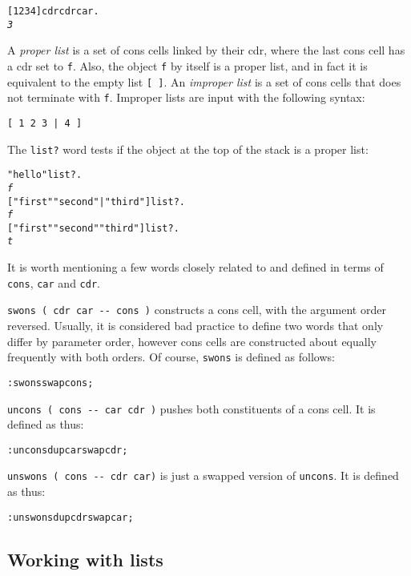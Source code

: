 \documentclass[english]{article}
\begin{document}
\begin{alltt}
{[} 1 2 3 4 {]} cdr cdr car .
\emph{3}
\end{alltt}
A \emph{proper list} is a set of cons cells linked by their cdr, where the last cons cell has a cdr set to \texttt{f}. Also, the object \texttt{f} by itself
is a proper list, and in fact it is equivalent to the empty list \texttt{{[}
{]}}. An \emph{improper list} is a set of cons cells that does not terminate with \texttt{f}. Improper lists are input with the following syntax:

\begin{verbatim}
[ 1 2 3 | 4 ]
\end{verbatim}

The \texttt{list?} word tests if the object at the top of the stack
is a proper list:

\begin{alltt}
"hello" list? .
\emph{f}
{[} "first" "second" | "third" {]} list? .
\emph{f}
{[} "first" "second" "third" {]} list? .
\emph{t}
\end{alltt}

It is worth mentioning a few words closely related to and defined in terms of \texttt{cons}, \texttt{car} and \texttt{cdr}.

\texttt{swons ( cdr car -{}- cons )} constructs a cons cell, with the argument order reversed. Usually, it is considered bad practice to define two words that only differ by parameter order, however cons cells are constructed about equally frequently with both orders. Of course, \texttt{swons} is defined as follows:

\begin{alltt}
: swons swap cons ;
\end{alltt}

\texttt{uncons ( cons -{}- car cdr )} pushes both constituents of a cons cell. It is defined as thus:

\begin{alltt}
: uncons dup car swap cdr ;
\end{alltt}

\texttt{unswons ( cons -{}- cdr car)} is just a swapped version of \texttt{uncons}. It is defined as thus:

\begin{alltt}
: unswons dup cdr swap car ;
\end{alltt}

\subsection{Working with lists}
\end{document}
